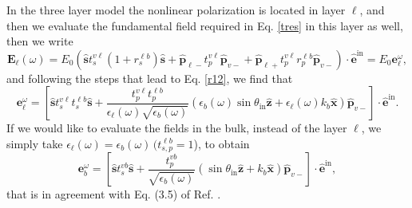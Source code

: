 \documentclass[10pt]{article}
\begin{document}
In the three layer model the nonlinear polarization is located in layer $\ell$,
and then we evaluate the fundamental field required in Eq. \eqref{tres} in this
layer as well, then we write
\begin{equation}\label{m2}
\mathbf{E}_{\ell}(\omega)=E_0\left(
\hat{\mathbf{s}} t^{v\ell}_s(1+r^{\ell b}_s)\hat{\mathbf{s}}
+
\hat{\mathbf{p}}_{\ell-}
 t^{v\ell}_{p}
\hat{\mathbf{p}}_{v-}
+
\hat{\mathbf{p}}_{\ell+}
t^{v\ell}_{p}r^{\ell b}_{p}
\hat{\mathbf{p}}_{v-}
\right)\cdot\hat{\mathbf{e}}^{\mathrm{in}}=E_0\mathbf{e}^\omega_{\ell}
,
\end{equation} 
and following the steps that lead to Eq. \eqref{r12}, we find that
\begin{equation}\label{m12}
\mathbf{e}^{\omega}_{\ell}
= \left[
\hat{\mathbf{s}}t_{s}^{v\ell}t_{s}^{\ell b}\hat{\mathbf{s}} 
+ \frac{t^{v\ell}_{p}t^{\ell b}_{p}}
       {\epsilon_{\ell}(\omega)\sqrt{\epsilon_{b}(\omega)}}
\left(
  \epsilon_{b}(\omega)\sin\theta_{\mathrm{in}}\hat{\mathbf{z}}
+ \epsilon_{\ell}(\omega)k_{b}\hat{\mathbf{x}}
\right)
\hat{\mathbf{p}}_{v-}
\right]
\cdot\hat{\mathbf{e}}^{\mathrm{in}}.  
\end{equation}  
If we would like to evaluate the fields in the bulk, instead of the layer
$\ell$, we simply take $\epsilon_{\ell}(\omega)=\epsilon_{b}(\omega)\,(t^{\ell
b}_{s,p}=1$), to obtain
\begin{equation}\label{m13}
\mathbf{e}^{\omega}_{b}
= \left[
\hat{\mathbf{s}}t_{s}^{vb}\hat{\mathbf{s}}
+ \frac{t^{vb}_{p}}{\sqrt{\epsilon_{b}(\omega)}}
\left(
\sin\theta_{\mathrm{in}}\hat{\mathbf{z}} + k_{b}\hat{\mathbf{x}}
\right) 
\hat{\mathbf{p}}_{v-}
\right]
\cdot\hat{\mathbf{e}}^{\mathrm{in}},  
\end{equation} 
that is in agreement with Eq. (3.5) of Ref. \cite{mizrahiJOSA88}.
\end{document}
